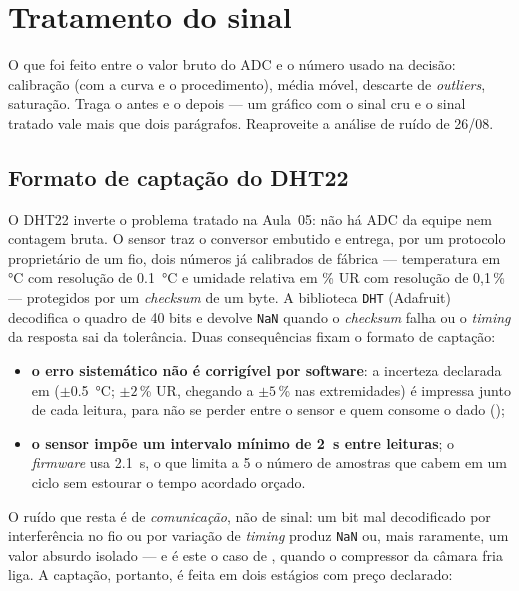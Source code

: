 \section{Tratamento do sinal}
\label{sec:sinal}

\begin{orientacao}
O que foi feito entre o valor bruto do ADC e o número usado na decisão:
calibração (com a curva e o procedimento), média móvel, descarte de
\emph{outliers}, saturação. Traga o antes e o depois --- um gráfico com
o sinal cru e o sinal tratado vale mais que dois parágrafos. Reaproveite
a análise de ruído de 26/08.
\end{orientacao}

\subsection{Formato de captação do DHT22}

O DHT22 inverte o problema tratado na Aula~05: não há ADC da equipe nem
contagem bruta. O sensor traz o conversor embutido e entrega, por um
protocolo proprietário de um fio, dois números já calibrados de
fábrica --- temperatura em \si{\celsius} com resolução de
\SI{0.1}{\celsius} e umidade relativa em \% UR com resolução de
0,1\,\% --- protegidos por um \emph{checksum} de um byte. A biblioteca
\texttt{DHT} (Adafruit) decodifica o quadro de 40 bits e devolve
\texttt{NaN} quando o \emph{checksum} falha ou o \emph{timing} da
resposta sai da tolerância. Duas consequências fixam o formato de
captação:

\begin{itemize}
  \item \textbf{o erro sistemático não é corrigível por software}: a
    incerteza declarada em \folhadedados{} ($\pm$\SI{0.5}{\celsius};
    $\pm 2$\,\% UR, chegando a $\pm 5$\,\% nas extremidades) é
    impressa junto de cada leitura, para não se perder entre o sensor
    e quem consome o dado ();
  \item \textbf{o sensor impõe um intervalo mínimo de \SI{2}{\second}
    entre leituras}; o \emph{firmware} usa \SI{2.1}{\second}, o que
    limita a 5 o número de amostras que cabem em um ciclo sem
    estourar o tempo acordado orçado.
\end{itemize}

O ruído que resta é de \emph{comunicação}, não de sinal: um bit mal
decodificado por interferência no fio ou por variação de \emph{timing}
produz \texttt{NaN} ou, mais raramente, um valor absurdo isolado --- e
é este o caso de , quando o compressor da câmara fria liga. A
captação, portanto, é feita em dois estágios com preço declarado:

